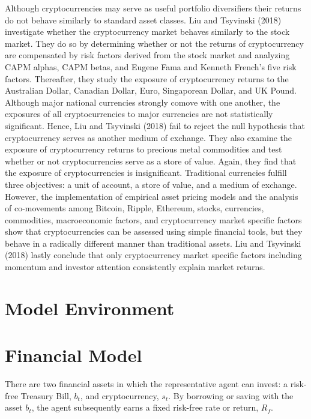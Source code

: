 \documentclass[]{article}
\begin{document}
Although cryptocurrencies may serve as useful portfolio diversifiers
their returns do not behave similarly to standard asset classes. Liu and
Tsyvinski (2018) investigate whether the cryptocurrency market behaves
similarly to the stock market. They do so by determining whether or not
the returns of cryptocurrency are compensated by risk factors derived
from the stock market and analyzing CAPM alphas, CAPM betas, and Eugene
Fama and Kenneth French's five risk factors. Thereafter, they study the
exposure of cryptocurrency returns to the Australian Dollar, Canadian
Dollar, Euro, Singaporean Dollar, and UK Pound. Although major national
currencies strongly comove with one another, the exposures of all
cryptocurrencies to major currencies are not statistically significant.
Hence, Liu and Tsyvinski (2018) fail to reject the null hypothesis that
cryptocurrency serves as another medium of exchange. They also examine
the exposure of cryptocurrency returns to precious metal commodities and
test whether or not cryptocurrencies serve as a store of value. Again,
they find that the exposure of cryptocurrencies is insignificant.
Traditional currencies fulfill three objectives: a unit of account, a
store of value, and a medium of exchange. However, the implementation of
empirical asset pricing models and the analysis of co-movements among
Bitcoin, Ripple, Ethereum, stocks, currencies, commodities,
macroeconomic factors, and cryptocurrency market specific factors show
that cryptocurrencies can be assessed using simple financial tools, but
they behave in a radically different manner than traditional assets. Liu
and Tsyvinski (2018) lastly conclude that only cryptocurrency market
specific factors including momentum and investor attention consistently
explain market returns.

\section{Model Environment}\label{model-environment}

\section{Financial Model}\label{financial-model}

There are two financial assets in which the representative agent can
invest: a risk-free Treasury Bill, \(b_t\), and cryptocurrency, \(s_t\).
By borrowing or saving with the asset \(b_t\), the agent subsequently
earns a fixed risk-free rate or return, \(R_f\).
\end{document}
